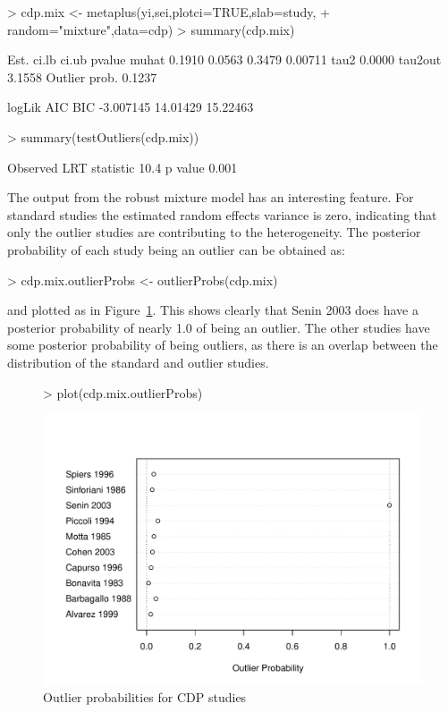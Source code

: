 \documentclass{article}
\begin{document}
\begin{Schunk}
\begin{Sinput}
> cdp.mix <- metaplus(yi,sei,plotci=TRUE,slab=study,
+         random="mixture",data=cdp)
> summary(cdp.mix)
\end{Sinput}
\begin{Soutput}
                Est.  ci.lb  ci.ub  pvalue
muhat         0.1910 0.0563 0.3479 0.00711
tau2          0.0000                      
tau2out       3.1558                      
Outlier prob. 0.1237                      

     logLik      AIC      BIC
  -3.007145 14.01429 15.22463
\end{Soutput}
\begin{Sinput}
> summary(testOutliers(cdp.mix))
\end{Sinput}
\begin{Soutput}
Observed LRT statistic 10.4 p value 0.001
\end{Soutput}
\end{Schunk}
The output from the robust mixture model has an interesting feature. For standard studies the estimated random effects variance is zero, indicating that only the outlier studies are contributing to the heterogeneity. The posterior probability of each study being an outlier can be obtained as:
\begin{Schunk}
\begin{Sinput}
> cdp.mix.outlierProbs <- outlierProbs(cdp.mix)
\end{Sinput}
\end{Schunk}
and plotted as in Figure~\ref{fig:outliers2}. This shows clearly that Senin 2003 does have a posterior probability of nearly 1.0 of being an outlier. The other studies have some posterior probability of being outliers, as there is an overlap between the distribution of the standard and outlier studies.

\begin{figure}
  \centering
\begin{Schunk}
\begin{Sinput}
> plot(cdp.mix.outlierProbs)
\end{Sinput}
\end{Schunk}
\includegraphics{metaplus-examples-013}
  \caption{Outlier probabilities for CDP studies}
  \label{fig:outliers2}
\end{figure}
\end{document}
